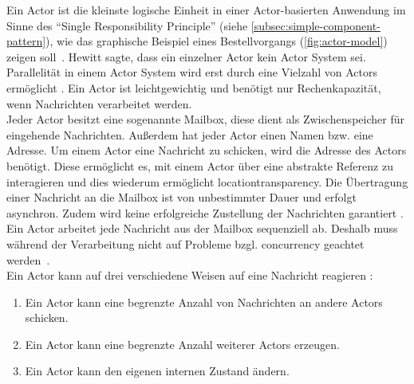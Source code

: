Ein Actor ist die kleinste logische Einheit in einer Actor-basierten Anwendung im Sinne des \enquote{Single Responsibility Principle} (siehe \ref{subsec:simple-component-pattern}), wie das graphische Beispiel eines Bestellvorgangs (\autoref{fig:actor-model}) zeigen soll~\cite[S.~13]{vernon_reactive_2016}. Hewitt sagte, dass ein einzelner Actor kein Actor System sei. Parallelität in einem Actor System wird erst durch eine Vielzahl von Actors ermöglicht \cite[S.~15]{vernon_reactive_2016}. Ein Actor ist leichtgewichtig und benötigt nur Rechenkapazität, wenn Nachrichten verarbeitet werden.\\
Jeder Actor besitzt eine sogenannte Mailbox, diese dient als Zwischenspeicher für eingehende Nachrichten. Außerdem hat jeder Actor einen Namen bzw. eine Adresse. Um einem Actor eine Nachricht zu schicken, wird die Adresse des Actors benötigt. Diese ermöglicht es, mit einem Actor über eine abstrakte Referenz zu interagieren und dies wiederum ermöglicht \gls{locationtransparency}. Die Übertragung einer Nachricht an die Mailbox ist von unbestimmter Dauer und erfolgt asynchron. Zudem wird keine erfolgreiche Zustellung der Nachrichten garantiert \cite[S.~84]{erb_concurrent_2012} \cite[S.~83]{kuhn_reactive_2015}.\\
Ein Actor arbeitet jede Nachricht aus der Mailbox sequenziell ab. Deshalb muss während der Verarbeitung nicht auf Probleme bzgl. \gls{concurrency} geachtet werden~\cite[S.~14]{vernon_reactive_2016}.\\
Ein Actor kann auf drei verschiedene Weisen auf eine Nachricht reagieren \cite[S.~84]{erb_concurrent_2012}:

\begin{enumerate}
\item Ein Actor kann eine begrenzte Anzahl von Nachrichten an andere Actors schicken.
\item Ein Actor kann eine begrenzte Anzahl weiterer Actors erzeugen.
\item Ein Actor kann den eigenen internen Zustand ändern.
\end{enumerate}

